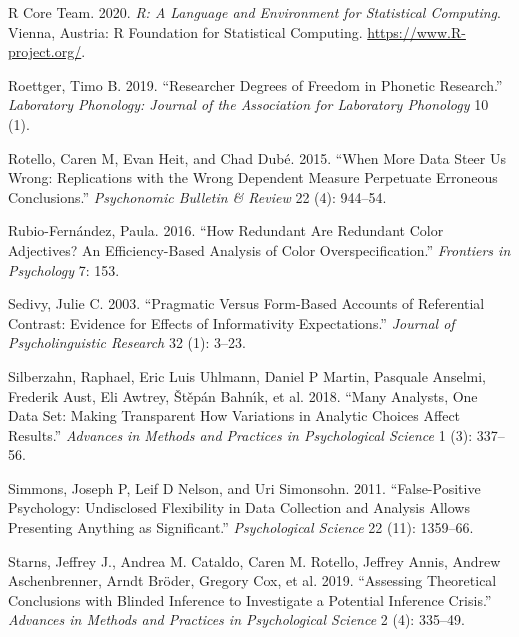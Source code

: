\documentclass[
  12pt,
]{article}
\newlength{\cslhangindent}
\newenvironment{CSLReferences}[2] %
 {%
  \setlength{\parindent}{0pt}
  \ifodd #1 \everypar{\setlength{\hangindent}{\cslhangindent}}\ignorespaces\fi
  \ifnum #2 > 0
  \setlength{\parskip}{#2\baselineskip}
  \fi
 }%
 {}
\begin{document}
\begin{CSLReferences}{1}{0}
\leavevmode{}%
R Core Team. 2020. \emph{R: A Language and Environment for Statistical Computing}. Vienna, Austria: R Foundation for Statistical Computing. \url{https://www.R-project.org/}.

\leavevmode{}%
Roettger, Timo B. 2019. {``Researcher Degrees of Freedom in Phonetic Research.''} \emph{Laboratory Phonology: Journal of the Association for Laboratory Phonology} 10 (1).

\leavevmode{}%
Rotello, Caren M, Evan Heit, and Chad Dubé. 2015. {``When More Data Steer Us Wrong: {R}eplications with the Wrong Dependent Measure Perpetuate Erroneous Conclusions.''} \emph{Psychonomic Bulletin \& Review} 22 (4): 944--54.

\leavevmode{}%
Rubio-Fernández, Paula. 2016. {``How Redundant Are Redundant Color Adjectives? An Efficiency-Based Analysis of Color Overspecification.''} \emph{Frontiers in Psychology} 7: 153.

\leavevmode{}%
Sedivy, Julie C. 2003. {``Pragmatic Versus Form-Based Accounts of Referential Contrast: Evidence for Effects of Informativity Expectations.''} \emph{Journal of Psycholinguistic Research} 32 (1): 3--23.

\leavevmode{}%
Silberzahn, Raphael, Eric Luis Uhlmann, Daniel P Martin, Pasquale Anselmi, Frederik Aust, Eli Awtrey, Štěpán Bahnı́k, et al. 2018. {``Many Analysts, One Data Set: Making Transparent How Variations in Analytic Choices Affect Results.''} \emph{Advances in Methods and Practices in Psychological Science} 1 (3): 337--56.

\leavevmode{}%
Simmons, Joseph P, Leif D Nelson, and Uri Simonsohn. 2011. {``False-Positive Psychology: Undisclosed Flexibility in Data Collection and Analysis Allows Presenting Anything as Significant.''} \emph{Psychological Science} 22 (11): 1359--66.

\leavevmode{}%
Starns, Jeffrey J., Andrea M. Cataldo, Caren M. Rotello, Jeffrey Annis, Andrew Aschenbrenner, Arndt Bröder, Gregory Cox, et al. 2019. {``Assessing Theoretical Conclusions with Blinded Inference to Investigate a Potential Inference Crisis.''} \emph{Advances in Methods and Practices in Psychological Science} 2 (4): 335--49.


\end{CSLReferences}
\end{document}
